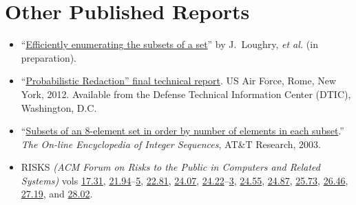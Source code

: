 \section*{Other Published Reports}
\vspace{-2mm}

\begin{itemize}
	\item ``\href{http://www.call-with-current-continuation.com/papers/subset.pdf}%
{Efficiently enumerating the subsets of a set}'' by J.\ Loughry,
{\it et al.} (in preparation).\vspace{-1mm}

	\item ``\href{http://call-with-current-continuation.com/papers/Loughry2011.pdf}%
{Probabilistic Redaction'' final technical report}. US Air Force, Rome,
New York, 2012. Available from the Defense Technical Information Center
(DTIC), Washington, D.C.\vspace{-1mm}

	\item ``\href{http://oeis.org/A047869}{Subsets of an 8-element set
		in order by number of elements in each subset}.'' \emph{The On-line
		Encyclopedia of Integer Sequences}, AT\&T Research, 2003.\vspace{-1mm}

	\item RISKS \emph{(ACM Forum on Risks to the Public in Computers
		and Related Systems)} vols
		\href{http://catless.ncl.ac.uk/Risks/17.31.html}{17.31},
		\href{http://catless.ncl.ac.uk/Risks/21.94.html}{21.94}--\href{http://catless.ncl.ac.uk/Risks/21.95.html}{5},
		\href{http://catless.ncl.ac.uk/Risks/21.81.html}{22.81},
		\href{http://catless.ncl.ac.uk/Risks/24.07.html}{24.07},
		\href{http://catless.ncl.ac.uk/Risks/24.22.html}{24.22}--\href{http://catless.ncl.ac.uk/Risks/24.23.html}{3},
		\href{http://catless.ncl.ac.uk/Risks/24.55.html}{24.55},
		\href{http://catless.ncl.ac.uk/Risks/24.87.html}{24.87},
		\href{http://catless.ncl.ac.uk/Risks/25.73.html}{25.73},
		\href{http://catless.ncl.ac.uk/Risks/26.46.html}{26.46},
		\href{http://catless.ncl.ac.uk/Risks/27.19.html}{27.19},
		and \href{http://catless.ncl.ac.uk/Risks/28.02.html}{28.02}.
\end{itemize}

